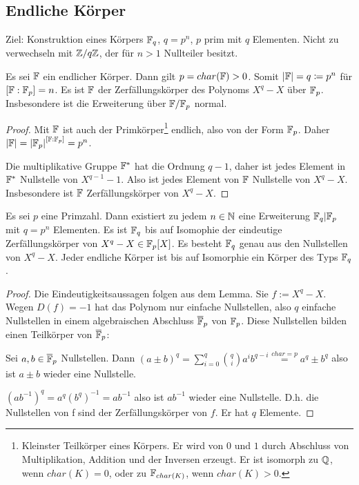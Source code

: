 \documentclass[../main.tex]{subfiles}
\begin{document}
\subsection{Endliche Körper}
Ziel: Konstruktion eines Körpers $\mathbb{F}_q$, $q=p^n$, $p$ prim mit $q$ Elementen. Nicht zu verwechseln mit $\mathbb{Z}/q\mathbb{Z}$, der für $n>1$ Nullteiler besitzt.
\begin{lemma}
    Es sei $\mathbb{F}$ ein endlicher Körper. Dann gilt $p=char(\mathbb{F})>0$. Somit $\left\vert \mathbb{F} \right\vert = q \coloneqq p^n$ für $[\mathbb{F}:\mathbb{F}_p] = n$. Es ist $\mathbb{F}$ der Zerfällungskörper des Polynoms $X^q-X$ über $\mathbb{F}_p$. Insbesondere ist die Erweiterung über $\mathbb{F}/\mathbb{F}_p$ normal.
\end{lemma}
\begin{proof}
    Mit $\mathbb{F}$ ist auch der Primkörper\footnote{Kleinster Teilkörper eines Körpers. Er wird von $0$ und $1$ durch Abschluss von Multiplikation, Addition und der Inversen erzeugt. Er ist isomorph zu $\mathbb{Q}$, wenn $char(K)=0$, oder zu $\mathbb{F}_{char(K)}$, wenn $char(K) > 0$.} endlich, also von der Form $\mathbb{F}_p$. Daher $\left\vert \mathbb{F} \right\vert = \left\vert \mathbb{F}_p \right\vert^{[\mathbb{F}:\mathbb{F}_p]} = p^n$.

    Die multiplikative Gruppe $\mathbb{F}^*$ hat die Ordnung $q-1$, daher ist jedes Element in $\mathbb{F}^*$ Nullstelle von $X^{q-1}-1$. Also ist jedes Element von $\mathbb{F}$ Nullstelle von $X^q-X$.
    Insbesondere ist $\mathbb{F}$ Zerfällungskörper von $X^q-X$.
\end{proof}

\begin{theorem}
    Es sei $p$ eine Primzahl. Dann existiert zu jedem $n\in \mathbb{N}$ eine Erweiterung $\mathbb{F}_q|\mathbb{F}_p$ mit $q=p^n$ Elementen. Es ist $\mathbb{F}_q$ bis auf Isomophie der eindeutige Zerfällungskörper von $X^q-X\in \mathbb{F}_p[X]$.
    Es besteht $\mathbb{F}_q$ genau aus den Nullstellen von $X^q-X$.
    Jeder endliche Körper ist bis auf Isomorphie ein Körper des Typs $\mathbb{F}_q$.
\end{theorem}
\begin{proof}
    Die Eindeutigkeitsaussagen folgen aus dem Lemma.
    Sie $f:= X^q-X$. Wegen $D(f)=-1$ hat das Polynom nur einfache Nullstellen, also $q$ einfache Nullstellen in einem algebraischen Abschluss $\overline{\mathbb{F}}_p$ von $\mathbb{F}_p$.
    Diese Nullstellen bilden einen Teilkörper von $\overline{\mathbb{F}}_p$:


    Sei $a,b\in \overline{\mathbb{F}}_p$ Nullstellen. Dann $(a\pm b)^q =\sum_{i=0}^q \binom{q}{i}a^ib^{q-i} \overset{char = p}{=} a^q\pm b^q$ also ist $a\pm b$ wieder eine Nullstelle.

    $(ab^{-1})^q = a^q (b^q)^{-1} = ab^{-1}$ also ist $ab^{-1}$ wieder eine Nullstelle.
    D.h. die Nullstellen von f sind der Zerfällungskörper von $f$. Er hat $q$ Elemente.
\end{proof}
\end{document}
